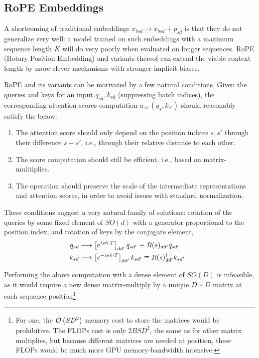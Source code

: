 \subsection{RoPE Embeddings}

A shortcoming of traditional embeddings $ x _{ bsd } \longrightarrow x _{ bsd } + p _{ sd } $ is
that they do not generalize very well: a model trained on such embeddings with a maximum sequence
length $ K $ will do very poorly when evaluated on longer sequences. RoPE (Rotary Position
Embedding) \cite{su2022roformer} and variants thereof can extend the viable context length by more
clever mechanisms with stronger implicit biases.

RoPE and its variants can be motivated by a few natural conditions.  Given the queries and keys for
an input $ q _{ sd }, k _{ sd } $ (suppressing batch indices), the corresponding attention scores
computation $ a _{ ss' }\left ( q _{ s }, k _{ s' } \right ) $ should reasonably satisfy the below:
\begin{enumerate}
	\item The attention score should only depend on the position indices $ s, s' $ through their difference
	      $ s-s' $, i.e., through their relative distance to each other.
	\item The score computation should still be efficient, i.e., based on matrix-mulitiplies.
	\item The operation should preserve the scale of the intermediate representations and attention
	      scores, in order to avoid issues with standard normalization.
\end{enumerate}
These conditions suggest a very natural family of solutions: rotation of the queries by some fixed
element of $ SO(d) $ with a generator proportional to the position index, and rotation of keys by
the conjugate element,
\begin{align}
	q _{ sd } & \longrightarrow \left [e^{ i s \hat{n}\cdot T }\right ]_{ d d' } q _{ sd' } \equiv R(s) _{ d d' } q _{ sd' } \nonumber\\
	k _{ sd } & \longrightarrow \left [e^{ -i s \hat{n}\cdot T }\right ]_{ d d' } k _{ sd' } \equiv  R(s)^{ \dagger } _{ d d' } k _{ sd' } \ . \label{eq_rope}
\end{align}

Performing the above computation with a dense element of $ SO(D) $ is infeasible, as it would require
a new dense matrix-multiply by a unique $ D \times D $ matrix at each sequence
position\footnote{For one, the $ \mathcal{O} \left( SD ^{ 2 } \right)  $ memory cost to store the matrices
    would be prohibitive. The FLOPs cost is only $ 2BSD ^{ 2 } $, the same as for other matrix
    multiplies, but because different matrices are needed at position, these FLOPs would be much more
    GPU memory-bandwidth intensive.
}

